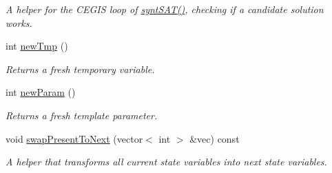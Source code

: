 \begin{DoxyCompactItemize}
\begin{DoxyCompactList}\small\item\em A helper for the C\-E\-G\-I\-S loop of \hyperlink{classTemplExplorer_adfba86d1d4bb40be2027c0cba3d447b3}{synt\-S\-A\-T()}, checking if a candidate solution works. \end{DoxyCompactList}\item 
int \hyperlink{classTemplExplorer_ae8e00b47f0819a24c4b419cd06d48377}{new\-Tmp} ()
\begin{DoxyCompactList}\small\item\em Returns a fresh temporary variable. \end{DoxyCompactList}\item 
int \hyperlink{classTemplExplorer_a9f5252557f8e464fbf60ac359f940a92}{new\-Param} ()
\begin{DoxyCompactList}\small\item\em Returns a fresh template parameter. \end{DoxyCompactList}\item 
void \hyperlink{classTemplExplorer_aca2e98c4fcbb3e86aea6b8692964e16c}{swap\-Present\-To\-Next} (vector$<$ int $>$ \&vec) const 
\begin{DoxyCompactList}\small\item\em A helper that transforms all current state variables into next state variables. \end{DoxyCompactList}\end{DoxyCompactItemize}

